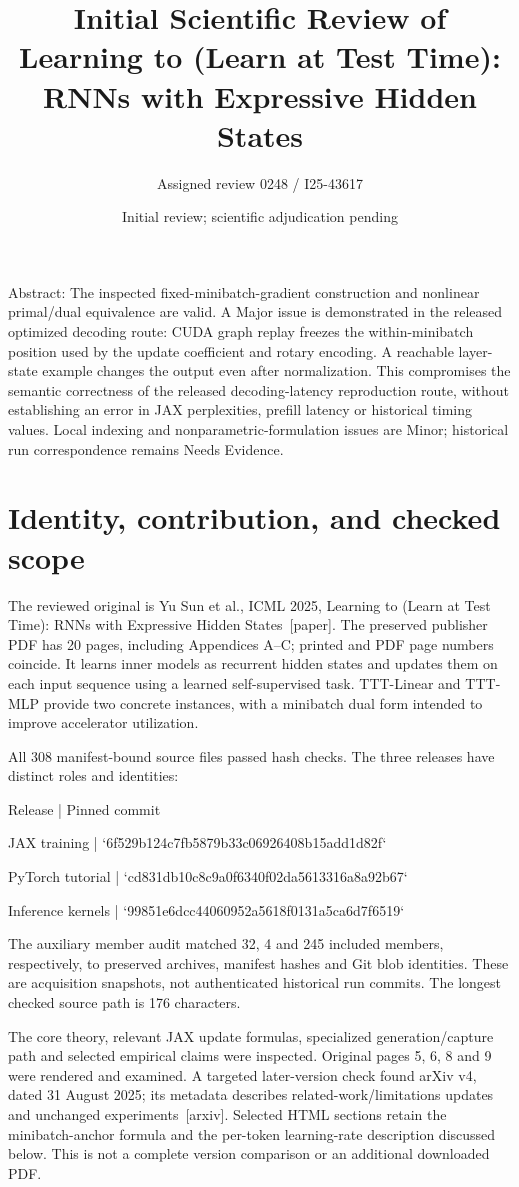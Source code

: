 \documentclass[10pt]{article}
\title{Initial Scientific Review of
Learning to (Learn at Test Time):
RNNs with Expressive Hidden States}
\author{Assigned review 0248 / I25-43617}
\date{Initial review; scientific adjudication pending}
\begin{document}
\maketitle
Abstract: The inspected fixed-minibatch-gradient construction and nonlinear primal/dual equivalence are valid. A Major issue is demonstrated in the released optimized decoding route: CUDA graph replay freezes the within-minibatch position used by the update coefficient and rotary encoding. A reachable layer-state example changes the output even after normalization. This compromises the semantic correctness of the released decoding-latency reproduction route, without establishing an error in JAX perplexities, prefill latency or historical timing values. Local indexing and nonparametric-formulation issues are Minor; historical run correspondence remains Needs Evidence.\par
\section*{Identity, contribution, and checked scope}
The reviewed original is Yu Sun et al., ICML 2025, Learning to (Learn at Test Time): RNNs with Expressive Hidden States [paper]. The preserved publisher PDF has 20 pages, including Appendices A–C; printed and PDF page numbers coincide. It learns inner models as recurrent hidden states and updates them on each input sequence using a learned self-supervised task. TTT-Linear and TTT-MLP provide two concrete instances, with a minibatch dual form intended to improve accelerator utilization.\par
All 308 manifest-bound source files passed hash checks. The three releases have distinct roles and identities:\par
Release | Pinned commit\par
JAX training | `6f529b124c7fb5879b33c06926408b15add1d82f`\par
PyTorch tutorial | `cd831db10c8c9a0f6340f02da5613316a8a92b67`\par
Inference kernels | `99851e6dcc44060952a5618f0131a5ca6d7f6519`\par
The auxiliary member audit matched 32, 4 and 245 included members, respectively, to preserved archives, manifest hashes and Git blob identities. These are acquisition snapshots, not authenticated historical run commits. The longest checked source path is 176 characters.\par
The core theory, relevant JAX update formulas, specialized generation/capture path and selected empirical claims were inspected. Original pages 5, 6, 8 and 9 were rendered and examined. A targeted later-version check found arXiv v4, dated 31 August 2025; its metadata describes related-work/limitations updates and unchanged experiments [arxiv]. Selected HTML sections retain the minibatch-anchor formula and the per-token learning-rate description discussed below. This is not a complete version comparison or an additional downloaded PDF.\par
\end{document}
